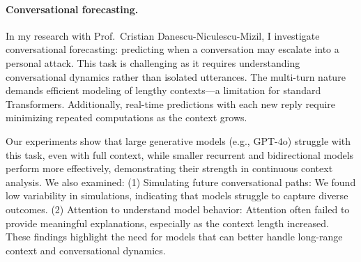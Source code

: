 
\paragraph{Conversational forecasting.}

In my research with Prof.~Cristian Danescu-Niculescu-Mizil, I investigate conversational forecasting: predicting when a conversation may escalate into a personal attack.
%
This task is challenging as it requires understanding conversational dynamics rather than isolated utterances.
%
The multi-turn nature demands efficient modeling of lengthy contexts---a limitation for standard Transformers.
%
Additionally, real-time predictions with each new reply require minimizing repeated computations as the context grows.

Our experiments show that large generative models (e.g., GPT-$4$o) struggle with this task, even with full context, while smaller recurrent and bidirectional models perform more effectively, demonstrating their strength in continuous context analysis.
%
We also examined:
%
(1) Simulating future conversational paths: We found low variability in simulations, indicating that models struggle to capture diverse outcomes.
%
(2) Attention to understand model behavior: Attention often failed to provide meaningful explanations, especially as the context length increased.
%
These findings highlight the need for models that can better handle long-range context and conversational dynamics.
%

